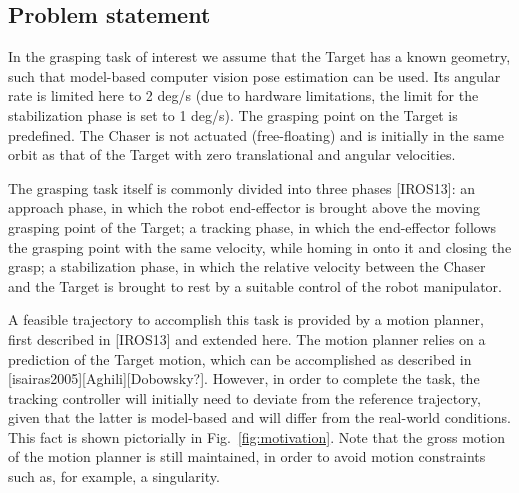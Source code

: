 \subsection{Problem statement}
%
In the grasping task of interest we assume that the Target has a known geometry, such that model-based computer vision pose estimation can be used. Its angular rate is limited here to 2 deg/s (due to hardware limitations, the limit for the stabilization phase is set to 1 deg/s). %
The grasping point on the Target is predefined. %
%
The Chaser is not actuated (free-floating) and is initially in the same orbit as that of the Target with zero translational and angular velocities.

The grasping task itself is commonly divided into three phases [IROS13]: an approach phase, in which the robot end-effector is brought above the moving grasping point of the Target; a tracking phase, in which the end-effector follows the grasping point with the same velocity, while homing in onto it and closing the grasp; a stabilization phase, in which the relative velocity between the Chaser and the Target is brought to rest by a suitable control of the robot manipulator. 

A feasible trajectory to accomplish this task is provided by a motion planner, first described in [IROS13] and extended here. The motion planner relies on a prediction of the Target motion, which can be accomplished as described in [isairas2005][Aghili][Dobowsky?]. However, in order to complete the task, the tracking controller will initially need to deviate from the reference trajectory, given that the latter is model-based and will differ from the real-world conditions. This fact is shown pictorially in Fig.~\ref{fig:motivation}. Note that the gross motion of the motion planner is still maintained, in order to avoid motion constraints such as, for example, a singularity. 

